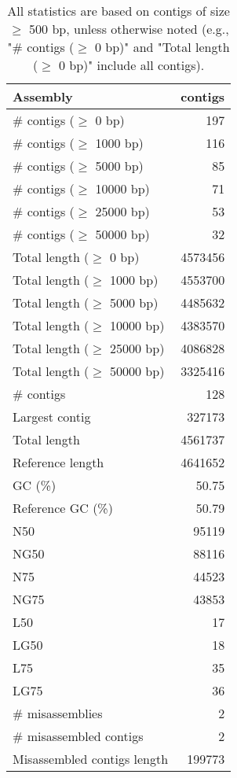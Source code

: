 \documentclass[12pt,a4paper]{article}
\begin{document}
\begin{table}[ht]
\begin{center}
\caption{All statistics are based on contigs of size $\geq$ 500 bp, unless otherwise noted (e.g., "\# contigs ($\geq$ 0 bp)" and "Total length ($\geq$ 0 bp)" include all contigs).}
\begin{tabular}{|l*{1}{|r}|}
\hline
Assembly & contigs \\ \hline
\# contigs ($\geq$ 0 bp) & 197 \\ \hline
\# contigs ($\geq$ 1000 bp) & 116 \\ \hline
\# contigs ($\geq$ 5000 bp) & 85 \\ \hline
\# contigs ($\geq$ 10000 bp) & 71 \\ \hline
\# contigs ($\geq$ 25000 bp) & 53 \\ \hline
\# contigs ($\geq$ 50000 bp) & 32 \\ \hline
Total length ($\geq$ 0 bp) & 4573456 \\ \hline
Total length ($\geq$ 1000 bp) & 4553700 \\ \hline
Total length ($\geq$ 5000 bp) & 4485632 \\ \hline
Total length ($\geq$ 10000 bp) & 4383570 \\ \hline
Total length ($\geq$ 25000 bp) & 4086828 \\ \hline
Total length ($\geq$ 50000 bp) & 3325416 \\ \hline
\# contigs & 128 \\ \hline
Largest contig & 327173 \\ \hline
Total length & 4561737 \\ \hline
Reference length & 4641652 \\ \hline
GC (\%) & 50.75 \\ \hline
Reference GC (\%) & 50.79 \\ \hline
N50 & 95119 \\ \hline
NG50 & 88116 \\ \hline
N75 & 44523 \\ \hline
NG75 & 43853 \\ \hline
L50 & 17 \\ \hline
LG50 & 18 \\ \hline
L75 & 35 \\ \hline
LG75 & 36 \\ \hline
\# misassemblies & 2 \\ \hline
\# misassembled contigs & 2 \\ \hline
Misassembled contigs length & 199773 \\ \hline

\end{tabular}
\end{center}
\end{table}
\end{document}
